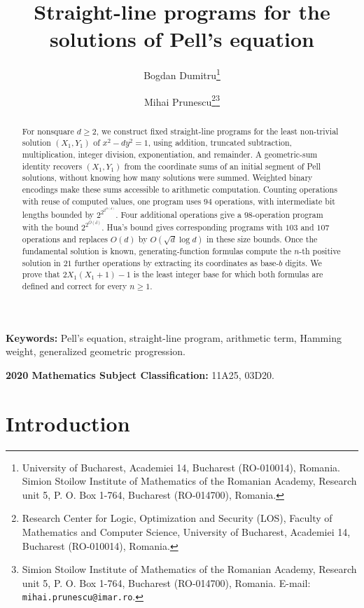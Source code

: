 \documentclass[11pt]{article}
\theoremstyle{remark}
\begin{document}
\title{Straight-line programs for the solutions of Pell's equation}
\author{Bogdan Dumitru\footnote{University of Bucharest, Academiei 14,
Bucharest (RO-010014), Romania. Simion Stoilow Institute of Mathematics
of the Romanian Academy, Research unit 5, P. O. Box 1-764,
Bucharest (RO-014700), Romania.}
\and Mihai Prunescu\footnote{Research Center for Logic, Optimization and
Security (LOS), Faculty of Mathematics and Computer Science, University of
Bucharest, Academiei 14, Bucharest (RO-010014), Romania.}\footnote{Simion
Stoilow Institute of Mathematics of the Romanian Academy, Research unit 5,
P. O. Box 1-764, Bucharest (RO-014700), Romania.
E-mail: \texttt{mihai.prunescu@imar.ro}.}}
\date{}
\maketitle

\begin{abstract}
For nonsquare $d\ge2$, we construct fixed straight-line programs for
the least non-trivial solution $(X_1,Y_1)$ of $x^2-dy^2=1$, using addition,
truncated subtraction, multiplication, integer division, exponentiation,
and remainder. A geometric-sum identity recovers $(X_1,Y_1)$ from the
coordinate sums of an initial segment of Pell solutions, without knowing
how many solutions were summed. Weighted binary encodings make these sums
accessible to arithmetic computation. Counting operations with reuse of
computed values, one program uses $94$ operations, with intermediate
bit lengths bounded by $2^{2^{2^{O(d)}}}$. Four additional operations
give a $98$-operation program with the bound $2^{2^{O(d)}}$.
Hua's bound gives corresponding programs with $103$ and $107$ operations
and replaces $O(d)$ by $O(\sqrt d\log d)$ in these size bounds.
Once the fundamental solution is known, generating-function formulas
compute the $n$-th positive solution in $21$ further operations by
extracting its coordinates as base-$b$ digits. We prove that
$2X_1(X_1+1)-1$ is the least integer base for which both formulas
are defined and correct for every $n\ge1$.
\end{abstract}

\medskip
\textbf{Keywords:} Pell's equation, straight-line program, arithmetic term, Hamming weight,
generalized geometric progression.\par
\textbf{2020 Mathematics Subject Classification:} 11A25, 03D20.

\section{Introduction}\label{sec:intro}
\end{document}
